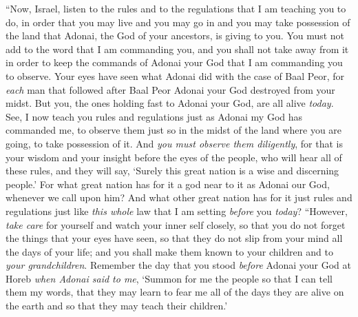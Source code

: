 \begin{biblechapter} %
 “Now, Israel, listen to the rules and to the regulations that I am teaching you to do, in order that you may live and you may go in and you may take possession of the land that Adonai, the God of your ancestors, is giving to you.
\verse You must not add to the word that I am commanding you, and you shall not take away from it in order to keep the commands of Adonai your God that I am commanding you to observe.
\verse Your eyes have seen what Adonai did with the case of Baal Peor, for \textit{each} man that followed after Baal Peor Adonai your God destroyed from your midst.
\verse But you, the ones holding fast to Adonai your God, are all alive \textit{today}.
\verse See, I now teach you rules and regulations just as Adonai my God has commanded me, to observe them just so in the midst of the land where you are going, to take possession of it.
\verse And \textit{you must observe them diligently}, for that is your wisdom and your insight before the eyes of the people, who will hear all of these rules, and they will say, ‘Surely this great nation is a wise and discerning people.’
\verse For what great nation has for it a god near to it as Adonai our God, whenever we call upon him?
\verse And what other great nation has for it just rules and regulations just like \textit{this whole} law that I am setting \textit{before} you \textit{today}?
\verse “However, \textit{take care} for yourself and watch your inner self closely, so that you do not forget the things that your eyes have seen, so that they do not slip from your mind all the days of your life; and you shall make them known to your children and to \textit{your grandchildren}.
\verse Remember the day that you stood \textit{before} Adonai your God at Horeb \textit{when Adonai said to me}, ‘Summon for me the people so that I can tell them my words, that they may learn to fear me all of the days they are alive on the earth and so that they may teach their children.’

\end{biblechapter}
